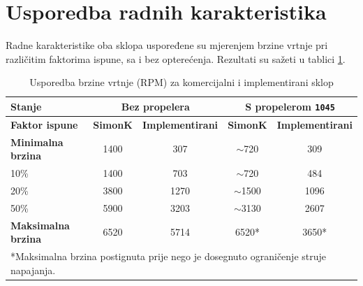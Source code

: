\documentclass[diplomskirad]{fer}
\begin{document}
\section{Usporedba radnih karakteristika}
\label{sec:usporedba_karakteristika}

Radne karakteristike oba sklopa uspoređene su mjerenjem brzine vrtnje pri
različitim faktorima ispune, sa i bez opterećenja. Rezultati su sažeti u
tablici \ref{tab:usporedba_brzina}.

\begin{table}[h!]
	\centering
	\caption{Usporedba brzine vrtnje (RPM) za komercijalni i implementirani sklop}
	\label{tab:usporedba_brzina}
	\begin{tabular}{|l|c|c|c|c|}
		\hline
		\textbf{Stanje}            & \multicolumn{2}{c|}{\textbf{Bez propelera}} & \multicolumn{2}{c|}{\textbf{S propelerom \texttt{1045}}}                                              \\ \hline
		\textbf{Faktor ispune}     & \textbf{SimonK}                             & \textbf{Implementirani}                                  & \textbf{SimonK}  & \textbf{Implementirani} \\ \hline
		\textbf{Minimalna brzina}  & \num{1400}                                  & \num{307}                                                & $\sim$\num{720}  & \num{309}               \\ \hline
		10\%                       & \num{1400}                                  & \num{703}                                                & $\sim$\num{720}  & \num{484}               \\ \hline
		20\%                       & \num{3800}                                  & \num{1270}                                               & $\sim$\num{1500} & \num{1096}              \\ \hline
		50\%                       & \num{5900}                                  & \num{3203}                                               & $\sim$\num{3130} & \num{2607}              \\ \hline
		\textbf{Maksimalna brzina} & \num{6520}                                  & \num{5714}                                               & \num{6520}*      & \num{3650}*             \\ \hline
		\multicolumn{5}{l}{\footnotesize{*Maksimalna brzina postignuta prije nego je dosegnuto ograničenje struje napajanja.}}
	\end{tabular}
\end{table}
\end{document}
